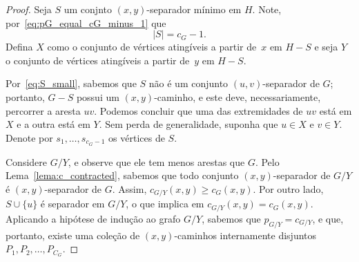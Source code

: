 \documentclass[12pt, a4paper]{article}
\theoremstyle{definition}
\begin{document}
\begin{proof}
Seja $S$ um conjnto $(x,y)$-separador mínimo em $H$. Note, por~\eqref{eq:pG_equal_cG_minus_1} que 
\begin{equation}
  \label{eq:S_small}
  |S| = c_G - 1.
\end{equation}
 Defina $X$ como o conjunto de vértices atingíveis a partir de~$x$ em $H - S$ e seja $Y$ o conjunto de vértices atingíveis a partir de~$y$ em $H - S$.

Por~\eqref{eq:S_small}, sabemos que $S$ não é um conjunto $(u,v)$-separador de $G$; portanto, $G - S$ possui um $(x,y)$-caminho, e este deve, necessariamente, percorrer a aresta $uv$. Podemos concluir que uma das extremidades de $uv$ está em $X$ e a outra está em $Y$. Sem perda de generalidade, suponha que $u \in X$ e $v \in Y$. Denote por $s_1, \dots, s_{c_G - 1}$ os vértices de $S$.

Considere $G/Y$, e observe que ele tem menos arestas que $G$. Pelo Lema~\ref{lema:c_contracted}, sabemos que todo conjunto $(x,y)$-separador de $G/Y$ é $(x,y)$-separador de $G$. Assim, $c_{G/Y}(x,y) \geq c_G(x,y)$. Por outro lado, $S \cup \{u\}$ é separador em $G/Y$, o que implica em $c_{G/Y}(x,y) = c_G(x,y)$. Aplicando a hipótese de indução ao grafo $G/Y$, sabemos que $p_{G/Y} = c_{G/Y}$, e que, portanto, existe uma coleção de $(x,y)$-caminhos internamente disjuntos $P_1, P_2, \dots, P_{C_G}$.


\end{proof}
\end{document}
